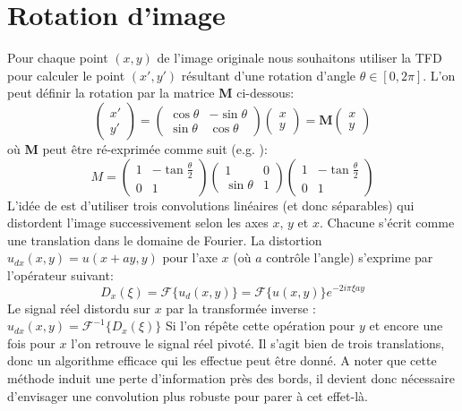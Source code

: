 \documentclass[12pt]{article}
\begin{document}
\section*{Rotation d'image}
Pour chaque point $(x, y)$ de l'image originale nous souhaitons utiliser la TFD pour calculer le point $(x', y')$ résultant d'une rotation d'angle  $\theta \in {[0, 2\pi]}$. L'on peut définir la rotation par la matrice \textbf{M} ci-dessous:
$$\begin{pmatrix}
x' \\ y'
\end{pmatrix}=
\begin{pmatrix}
\cos \theta & -\sin \theta \\
\sin \theta & \cos \theta
\end{pmatrix}
\begin{pmatrix}
x \\ y
\end{pmatrix}=\textbf{M}
\begin{pmatrix}
x \\ y
\end{pmatrix}
$$
où \textbf{M} peut être ré-exprimée comme suit (e.g. \cite{paeth86}):
$$M =
\begin{pmatrix}
1 & -\tan \frac{\theta}{2} \\
0 & 1
\end{pmatrix}
\begin{pmatrix}
1 & 0 \\
\sin \theta & 1
\end{pmatrix}
\begin{pmatrix}
1 & -\tan \frac{\theta }{2}\\
0 & 1
\end{pmatrix}
$$
L'idée de \cite{unser95} \cite{larkin97} est d'utiliser trois convolutions linéaires (et donc séparables) qui distordent l'image successivement selon les axes $x$, $y$ et $x$. 
Chacune s'écrit comme une translation dans le domaine de Fourier. La distortion $u_{dx}(x, y) = u(x + ay, y)$ pour l'axe $x$ (où $a$ contrôle l'angle) s'exprime par l'opérateur suivant:
$$ D_x(\xi) = \mathcal{F}\{u_d(x, y)\} = \mathcal{F}\{u(x, y)\} e^{-2 i \pi \xi a y}$$
Le signal réel distordu sur $x$ par la transformée inverse : $ u_{dx}(x, y) = \mathcal{F}^{-1}\{D_x(\xi) \} $ \newline
Si l'on répête cette opération pour $y$ et encore une fois pour $x$ l'on retrouve le signal réel pivoté. Il s'agit bien de trois translations, donc un algorithme efficace qui les effectue peut être donné. A noter que cette méthode induit une perte d'information près des bords, il devient donc nécessaire d'envisager une convolution plus robuste pour parer à cet effet-là.
\end{document}
